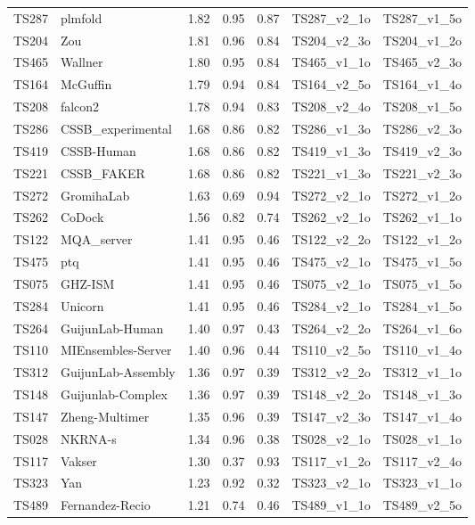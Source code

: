 \begin{table}[ht]
{\begin{tabular}{llrrrll}
TS287 & plmfold & 1.82 & 0.95 & 0.87 & TS287\_v2\_1o & TS287\_v1\_5o \\ 
TS204 & Zou & 1.81 & 0.96 & 0.84 & TS204\_v2\_3o & TS204\_v1\_2o \\ 
TS465 & Wallner & 1.80 & 0.95 & 0.84 & TS465\_v1\_1o & TS465\_v2\_3o \\ 
TS164 & McGuffin & 1.79 & 0.94 & 0.84 & TS164\_v2\_5o & TS164\_v1\_4o \\ 
TS208 & falcon2 & 1.78 & 0.94 & 0.83 & TS208\_v2\_4o & TS208\_v1\_5o \\ 
TS286 & CSSB\_experimental & 1.68 & 0.86 & 0.82 & TS286\_v1\_3o & TS286\_v2\_3o \\ 
TS419 & CSSB-Human & 1.68 & 0.86 & 0.82 & TS419\_v1\_3o & TS419\_v2\_3o \\ 
TS221 & CSSB\_FAKER & 1.68 & 0.86 & 0.82 & TS221\_v1\_3o & TS221\_v2\_3o \\ 
TS272 & GromihaLab & 1.63 & 0.69 & 0.94 & TS272\_v2\_1o & TS272\_v1\_2o \\ 
TS262 & CoDock & 1.56 & 0.82 & 0.74 & TS262\_v2\_1o & TS262\_v1\_1o \\ 
TS122 & MQA\_server & 1.41 & 0.95 & 0.46 & TS122\_v2\_2o & TS122\_v1\_2o \\ 
TS475 & ptq & 1.41 & 0.95 & 0.46 & TS475\_v2\_1o & TS475\_v1\_5o \\ 
TS075 & GHZ-ISM & 1.41 & 0.95 & 0.46 & TS075\_v2\_1o & TS075\_v1\_5o \\ 
TS284 & Unicorn & 1.41 & 0.95 & 0.46 & TS284\_v2\_1o & TS284\_v1\_5o \\ 
TS264 & GuijunLab-Human & 1.40 & 0.97 & 0.43 & TS264\_v2\_2o & TS264\_v1\_6o \\ 
TS110 & MIEnsembles-Server & 1.40 & 0.96 & 0.44 & TS110\_v2\_5o & TS110\_v1\_4o \\ 
TS312 & GuijunLab-Assembly & 1.36 & 0.97 & 0.39 & TS312\_v2\_2o & TS312\_v1\_1o \\ 
TS148 & Guijunlab-Complex & 1.36 & 0.97 & 0.39 & TS148\_v2\_2o & TS148\_v1\_3o \\ 
TS147 & Zheng-Multimer & 1.35 & 0.96 & 0.39 & TS147\_v2\_3o & TS147\_v1\_4o \\ 
TS028 & NKRNA-s & 1.34 & 0.96 & 0.38 & TS028\_v2\_1o & TS028\_v1\_1o \\ 
TS117 & Vakser & 1.30 & 0.37 & 0.93 & TS117\_v1\_2o & TS117\_v2\_4o \\ 
TS323 & Yan & 1.23 & 0.92 & 0.32 & TS323\_v2\_1o & TS323\_v1\_1o \\ 
TS489 & Fernandez-Recio & 1.21 & 0.74 & 0.46 & TS489\_v1\_1o & TS489\_v2\_5o \\ 

\end{tabular}}
\end{table}
